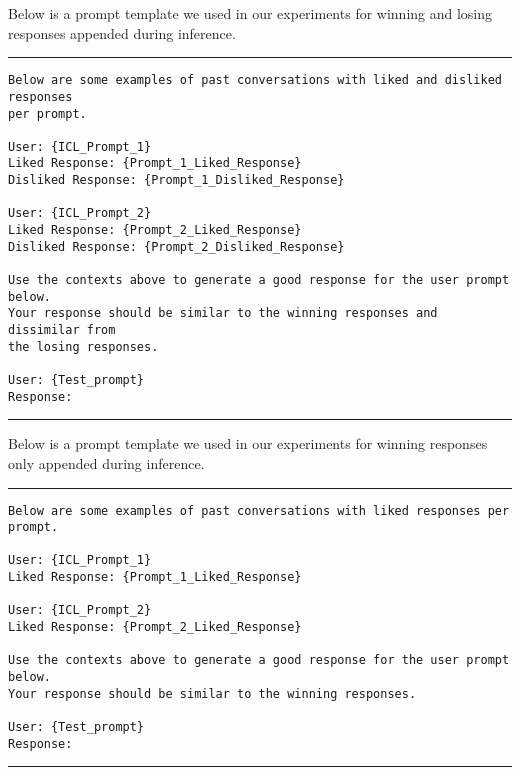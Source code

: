 Below is a prompt template we used in our experiments for winning and losing responses appended during inference.
\vspace{1cm}
\hrule
\begin{verbatim}
Below are some examples of past conversations with liked and disliked responses
per prompt. 

User: {ICL_Prompt_1}
Liked Response: {Prompt_1_Liked_Response}
Disliked Response: {Prompt_1_Disliked_Response}

User: {ICL_Prompt_2}
Liked Response: {Prompt_2_Liked_Response}
Disliked Response: {Prompt_2_Disliked_Response}

Use the contexts above to generate a good response for the user prompt below. 
Your response should be similar to the winning responses and dissimilar from
the losing responses. 

User: {Test_prompt}
Response: 
\end{verbatim}
\hrule
\vspace{1cm}
Below is a prompt template we used in our experiments for winning responses only appended during inference.
\vspace{1cm}
\hrule
\begin{verbatim}
Below are some examples of past conversations with liked responses per prompt. 

User: {ICL_Prompt_1}
Liked Response: {Prompt_1_Liked_Response}

User: {ICL_Prompt_2}
Liked Response: {Prompt_2_Liked_Response}

Use the contexts above to generate a good response for the user prompt below. 
Your response should be similar to the winning responses.

User: {Test_prompt}
Response: 
\end{verbatim}
\hrule